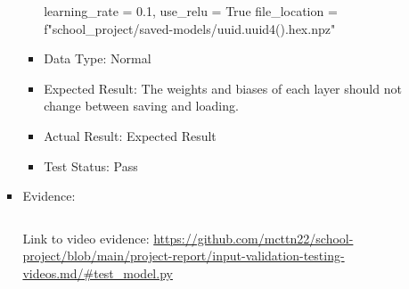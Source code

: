 \documentclass[./project-report/src/latex/project-report.tex]{subfiles}
\begin{document}
\begin{itemize}
\begin{itemize}
\begin{itemize}
\begin{itemize}
                            learning\_rate = 0.1, \newline
                            use\_relu = True
							file\_location = f"school\_project/saved-models/{uuid.uuid4().hex}.npz"
						\item Data Type: Normal
						\item Expected Result: The weights and biases of each layer should not change between saving and loading.
						\item Actual Result: Expected Result
						\item Test Status: Pass
					\end{itemize}
					\item Evidence:
						\inputminted{python}{./school_project/test/models/cpu/utils/test_model.py}
						\begin{figure}[h!]
						\centering
						\end{figure}
	
						Link to video evidence: \url{https://github.com/mcttn22/school-project/blob/main/project-report/input-validation-testing-videos.md/#test_model.py}

						\pagebreak


\end{itemize}
\end{itemize}
\end{itemize}
\end{document}
